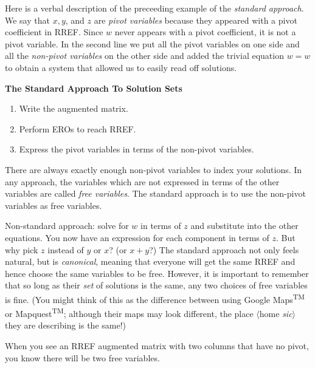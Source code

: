 Here is a verbal description of the preceeding example of the \hypertarget{standard approach}{{\itshape standard approach}}. We say that $x,y$, and $z$ are {\itshape pivot variables} because they appeared with a  pivot coefficient in RREF. 
Since $w$ never appears with a pivot  coefficient, 
 it is not a pivot variable. %
In the second line we put all the pivot variables on one side 
and all the {\itshape non-pivot variables} on the other side and added the trivial equation $w=w$ to obtain a system that allowed us to easily read off solutions.

\begin{center}
{\Large{\bfseries The Standard Approach To Solution Sets}}
\end{center}
\begin{enumerate}
\item Write the augmented matrix.
\item Perform EROs to reach RREF.
\item Express the pivot variables in terms of the non-pivot variables. 
\end{enumerate}
There are always exactly enough non-pivot variables to index your solutions. 
In any approach, the variables which are not expressed in terms of the other variables are called  {\itshape free variables}. The standard approach is to use the non-pivot variables as free variables.

Non-standard approach: solve for $w$ in terms of $z$ and substitute into the other equations. You now have an expression for each component in terms of $z$. But why pick $z$ instead of $y$ or $x$? (or $x+y$?) The standard approach not only feels natural, 
but is {\itshape canonical}, meaning that everyone will get the same RREF and hence choose the same variables to be free.
However, it is important to remember that so long as their {\itshape set} of solutions is the same, any two choices of free variables is fine.
(You might think of this as the difference between using Google Maps\textsuperscript{\sffamily TM} or Mapquest\textsuperscript{\sffamily TM}; although their maps may look different, 
the place 
$\langle$home {\itshape sic}$\rangle$ 
they are describing is the same!)


When you see an RREF augmented matrix with two columns that have no pivot, you know there will be two free variables. 

